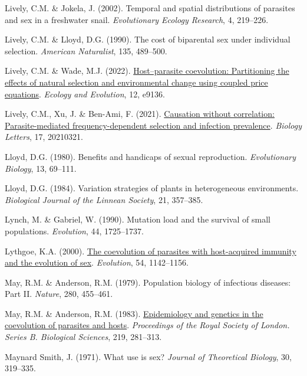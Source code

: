 \documentclass[
  letterpaper,
]{book}
\newlength{\cslhangindent}
\newenvironment{CSLReferences}[2] %
 {\begin{list}{}{%
  \setlength{\itemindent}{0pt}
  \setlength{\leftmargin}{0pt}
  \setlength{\parsep}{0pt}
  \ifodd #1
   \setlength{\leftmargin}{\cslhangindent}
   \setlength{\itemindent}{-1\cslhangindent}
  \fi
  \setlength{\itemsep}{#2\baselineskip}}}
 {\end{list}}
\begin{document}
\begin{CSLReferences}{1}{0}
Lively, C.M. \& Jokela, J. (2002). Temporal and spatial distributions of
parasites and sex in a freshwater snail. \emph{Evolutionary Ecology
Research}, 4, 219--226.

Lively, C.M. \& Lloyd, D.G. (1990). The cost of biparental sex under
individual selection. \emph{American Naturalist}, 135, 489--500.

Lively, C.M. \& Wade, M.J. (2022).
\href{https://doi.org/10.1002/ece3.9136}{Host--parasite coevolution:
Partitioning the effects of natural selection and environmental change
using coupled price equations}. \emph{Ecology and Evolution}, 12, e9136.

Lively, C.M., Xu, J. \& Ben-Ami, F. (2021).
\href{https://doi.org/10.1098/rsbl.2021.0321}{Causation without
correlation: Parasite-mediated frequency-dependent selection and
infection prevalence}. \emph{Biology Letters}, 17, 20210321.

Lloyd, D.G. (1980). Benefits and handicaps of sexual reproduction.
\emph{Evolutionary Biology}, 13, 69--111.

Lloyd, D.G. (1984). Variation strategies of plants in heterogeneous
environments. \emph{Biological Journal of the Linnean Society}, 21,
357--385.

Lynch, M. \& Gabriel, W. (1990). Mutation load and the survival of small
populations. \emph{Evolution}, 44, 1725--1737.

Lythgoe, K.A. (2000).
\href{https://doi.org/10.1111/j.0014-3820.2000.tb00550.x}{The
coevolution of parasites with host-acquired immunity and the evolution
of sex}. \emph{Evolution}, 54, 1142--1156.

May, R.M. \& Anderson, R.M. (1979). Population biology of infectious
diseases: Part II. \emph{Nature}, 280, 455--461.

May, R.M. \& Anderson, R.M. (1983).
\href{https://doi.org/10.1098/rspb.1983.0075}{Epidemiology and genetics
in the coevolution of parasites and hosts}. \emph{Proceedings of the
Royal Society of London. Series B. Biological Sciences}, 219, 281--313.

Maynard Smith, J. (1971). What use is sex? \emph{Journal of Theoretical
Biology}, 30, 319--335.


\end{CSLReferences}
\end{document}
